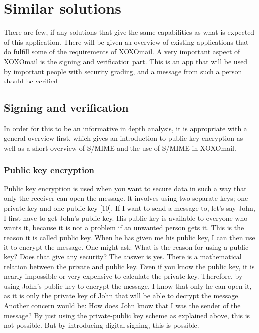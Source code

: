 

\section{Similar solutions}
There are few, if any solutions that give the same capabilities as what is expected of this application. There will be given an overview of existing applications that do fulfill some of the requirements of XOXOmail.
\newline
\newline
A very important aspect of XOXOmail is the signing and verification part. This is an app that will be used by important people with security grading, and a message from such a person should be verified.

\subsection{Signing and verification}
In order for this to be an informative in depth analysis, it is appropriate with a general overview first, which gives an introduction to public key encryption as well as a short overview of S/MIME and the use of S/MIME in XOXOmail.

\subsubsection{Public key encryption}
Public key encryption is used when you want to secure data in such a way that only the receiver can open the message. It involves using two separate keys; one private key and one public key [10].
\newline
\newline
If I want to send a message to, let's say John, I first have to get John's public key. His public key is available to everyone who wants it, because it is not a problem if an unwanted person gets it. This is the reason it is called public key. When he has given me his public key, I can then use it to encrypt the message. One might ask: What is the reason for using a
public key? Does that give any security? The answer is yes. There is a mathematical relation between the private and public key. Even if you know the public key, it is nearly impossible or very expensive to calculate the private key. Therefore, by using John's public key to encrypt the message. I know that only he can open it, as it is only the private key of John that will be able to decrypt the message.
\newline
\newline
Another concern would be: How does John know that I was the sender of the message? By just using the private-public key scheme as explained above, this is not possible. But by introducing digital signing, this is possible.

